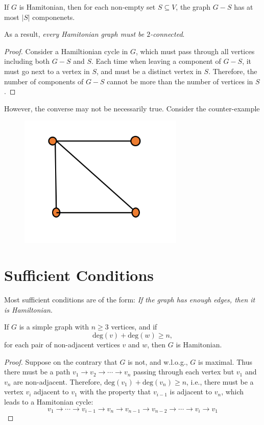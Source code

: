 \begin{theorem}
If $G$ is Hamitonian, then for each non-empty set $S\subseteq V$, the graph $G-S$ has at most $|S|$ componenets.
\end{theorem}
As a result, \emph{every Hamitonian graph must be $2$-connected}.
\begin{proof}
Consider a Hamiltionian cycle in $G$, which must pass through all vertices including both $G-S$ and $S$.
Each time when leaving a component of $G-S$, it must go next to a vertex in $S$, and must be a distinct vertex in $S$.
Therefore, the number of components of $G-S$ cannot be more than the number of vertices in $S$.
\end{proof}
\begin{remark}
However, the converse may not be necessarily true. Consider the counter-example
\begin{figure}[H]
\centering
\includegraphics[width=0.7\textwidth]{Third_lecture/p_2}
\end{figure}
\end{remark}
\section{Sufficient Conditions}
Most sufficient conditions are of the form:
\emph{If the graph has enough edges, then it is Hamiltonian}.

\begin{theorem}
If $G$ is a simple graph with $n\ge 3$ vertices, and if 
\[
\text{deg}(v)+\text{deg}(w)\ge n,
\]
for each pair of non-adjacent vertices $v$ and $w$, then $G$ is Hamitonian.
\end{theorem}
\begin{proof}
Suppose on the contrary that $G$ is not, and w.l.o.g., $G$ is maximal.
Thus there must be a path $v_1\to v_2\to\cdots\to v_n$ passing through each vertex but $v_1$ and $v_n$ are non-adjacent.
Therefore, $\text{deg}(v_1)+\text{deg}(v_n)\ge n$, i.e., there must be a vertex $v_i$ adjacent to $v_1$ with the property that $v_{i-1}$ is adjacent to $v_n$, which leads to a Hamitonian cycle:
\[
v_1\to \cdots\to v_{i-1}\to v_n\to v_{n-1}\to v_{n-2}\to\cdots\to v_i\to v_1
\]
\end{proof}

